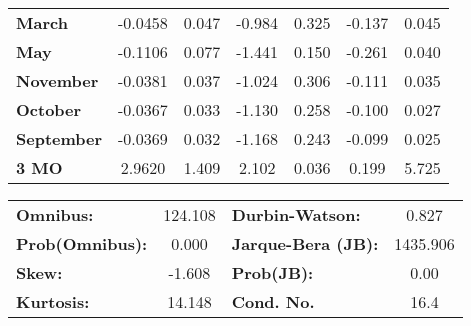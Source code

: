 \begin{center}
\begin{tabular}{lcccccc}
\textbf{March}     &      -0.0458  &        0.047     &    -0.984  &         0.325        &       -0.137    &        0.045     \\
\textbf{May}       &      -0.1106  &        0.077     &    -1.441  &         0.150        &       -0.261    &        0.040     \\
\textbf{November}  &      -0.0381  &        0.037     &    -1.024  &         0.306        &       -0.111    &        0.035     \\
\textbf{October}   &      -0.0367  &        0.033     &    -1.130  &         0.258        &       -0.100    &        0.027     \\
\textbf{September} &      -0.0369  &        0.032     &    -1.168  &         0.243        &       -0.099    &        0.025     \\
\textbf{3 MO}      &       2.9620  &        1.409     &     2.102  &         0.036        &        0.199    &        5.725     \\
\bottomrule
\end{tabular}
\begin{tabular}{lclc}
\textbf{Omnibus:}       & 124.108 & \textbf{  Durbin-Watson:     } &    0.827  \\
\textbf{Prob(Omnibus):} &   0.000 & \textbf{  Jarque-Bera (JB):  } & 1435.906  \\
\textbf{Skew:}          &  -1.608 & \textbf{  Prob(JB):          } &     0.00  \\
\textbf{Kurtosis:}      &  14.148 & \textbf{  Cond. No.          } &     16.4  \\
\bottomrule
\end{tabular}
\end{center}

